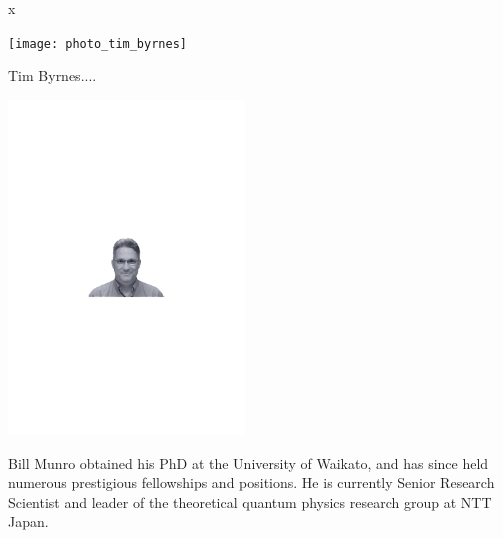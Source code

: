 x

%
%

\begin{center}
\texttt{[image: photo\_tim\_byrnes]}
\end{center}

Tim Byrnes....


%
%

\begin{center}
\includegraphics[width=0.47\textwidth]{photo_bill_munro}
\end{center}

Bill Munro obtained his PhD at the University of Waikato, and has since held numerous prestigious fellowships and positions. He is currently Senior Research Scientist and leader of the theoretical quantum physics research group at NTT Japan.

